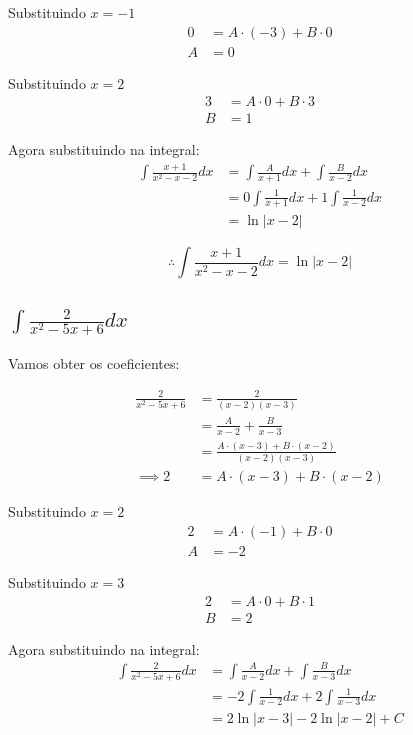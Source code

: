 \documentclass[12pt]{article}
\theoremstyle{definition}
\begin{document}
Substituindo \( x = -1 \)
\begin{align*}
    0
    &= A\cdot(-3) + B \cdot 0 \\
    A
    &= 0
\end{align*}

Substituindo \( x = 2 \)
\begin{align*}
    3 &= A \cdot 0 + B \cdot 3 \\
    B &= 1
\end{align*}

Agora substituindo na integral:
\begin{align*}
    \int{\frac{x+1}{x^2-x-2}dx}
    &= \int{\frac{A}{x+1}dx} + \int{\frac{B}{x-2}dx} \\
    &= 0\int{\frac{1}{x+1}dx} + 1\int{\frac{1}{x-2}dx} \\
    &= \ln{|x-2|}
\end{align*}

\[
    \boxed{
        \therefore \int{\frac{x+1}{x^2-x-2}dx} = \ln{|x-2|}
    }
\]

\subsection{\(\int{\frac{2}{x^2-5x+6}dx}\)}
Vamos obter os coeficientes:

\begin{align*}
    \frac{2}{x^2-5x+6}
    &= \frac{2}{(x-2)(x-3)} \\
    &= \frac{A}{x-2} + \frac{B}{x-3} \\
    &= \frac{A\cdot (x-3) + B\cdot(x-2)}{(x-2)(x-3)} \\
    \implies 2
    &= A\cdot (x-3) + B\cdot(x-2)
\end{align*}

Substituindo \( x = 2 \)
\begin{align*}
    2 &= A \cdot (-1) + B \cdot 0 \\
    A &= -2
\end{align*}

Substituindo \( x = 3 \)
\begin{align*}
    2 &= A \cdot 0 + B \cdot 1 \\
    B &= 2
\end{align*}

Agora substituindo na integral:
\begin{align*}
    \int{\frac{2}{x^2-5x+6}dx}
    &= \int{\frac{A}{x-2}dx} + \int{\frac{B}{x-3}dx} \\
    &= -2\int{\frac{1}{x-2}dx} + 2 \int{\frac{1}{x-3}dx} \\
    &= 2\ln{|x-3|} - 2 \ln{|x-2|} + C
\end{align*}
\end{document}
